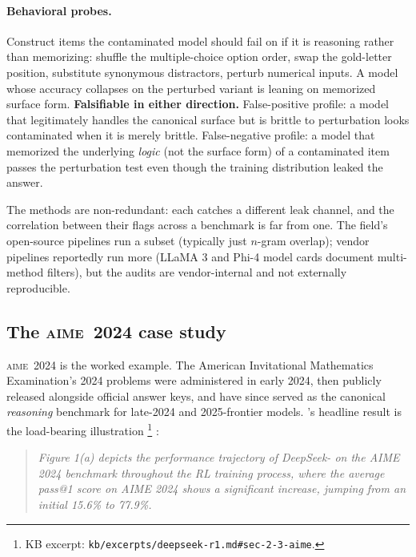 \paragraph{Behavioral probes.} Construct items the contaminated model
should fail on if it is reasoning rather than memorizing: shuffle the
multiple-choice option order, swap the gold-letter position,
substitute synonymous distractors, perturb numerical inputs.
A model whose accuracy collapses on the perturbed variant is leaning
on memorized surface form. \textbf{Falsifiable in either direction.}
False-positive profile: a model that legitimately handles the
canonical surface but is brittle to perturbation looks contaminated
when it is merely brittle. False-negative profile: a model that
memorized the underlying \emph{logic} (not the surface form) of a
contaminated item passes the perturbation test even though the
training distribution leaked the answer.

The methods are non-redundant: each catches a different leak channel,
and the correlation between their flags across a benchmark is far
from one. The field's open-source  pipelines run a
subset (typically just $n$-gram overlap); vendor pipelines reportedly
run more (LLaMA 3 and Phi-4 model cards document multi-method
filters), but the audits are vendor-internal and not externally
reproducible.

\subsection{The \textsc{aime~2024} case study}
\label{sec:contamination-aime}

\textsc{aime~2024} is the worked example. The American Invitational
Mathematics Examination's 2024 problems were administered in early
2024, then publicly released alongside official answer keys, and have
since served as the canonical \emph{reasoning} benchmark for late-2024
and 2025-frontier models. \citet{deepseek-r1}'s headline result is
the load-bearing illustration%
\footnote{KB excerpt: \texttt{kb/excerpts/deepseek-r1.md\#sec-2-3-aime}.}
\citep[\S{}2.3]{deepseek-r1}:

\begin{quote}\itshape
Figure 1(a) depicts the performance trajectory of DeepSeek- on
the AIME 2024 benchmark throughout the RL training process, where the
average pass@1 score on AIME 2024 shows a significant increase,
jumping from an initial 15.6\% to 77.9\%.
\end{quote}

